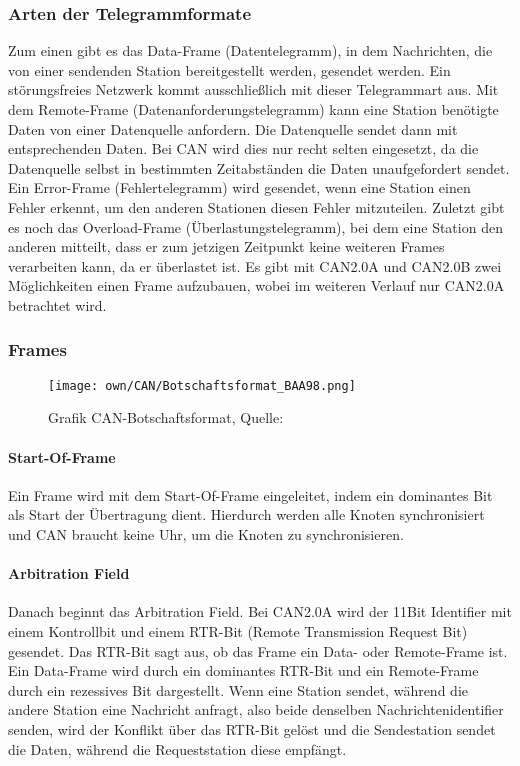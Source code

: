         \subsubsection{Arten der Telegrammformate}
        Zum einen gibt es das Data-Frame (Datentelegramm), in dem Nachrichten, die von einer sendenden Station bereitgestellt werden, gesendet werden.
        Ein störungsfreies Netzwerk kommt ausschließlich mit dieser Telegrammart aus.
        Mit dem Remote-Frame (Datenanforderungstelegramm) kann eine Station benötigte Daten von einer Datenquelle anfordern.
        Die Datenquelle sendet dann mit entsprechenden Daten.
        Bei CAN wird dies nur recht selten eingesetzt, da die Datenquelle selbst in bestimmten Zeitabständen die Daten unaufgefordert sendet.
        Ein Error-Frame (Fehlertelegramm) wird gesendet, wenn eine Station einen Fehler erkennt, um den anderen Stationen diesen Fehler mitzuteilen.
        Zuletzt gibt es noch das Overload-Frame (Überlastungstelegramm), bei dem eine Station den anderen mitteilt, dass er zum jetzigen Zeitpunkt keine weiteren Frames verarbeiten kann, da er überlastet ist.
        Es gibt mit CAN2.0A und CAN2.0B zwei Möglichkeiten einen Frame aufzubauen, wobei im weiteren Verlauf nur CAN2.0A betrachtet wird. 

        \subsubsection{Frames}
        \begin{figure}[!htbp]
            \centering
            \texttt{[image: own/CAN/Botschaftsformat\_BAA98.png]}
            \caption{Grafik CAN-Botschaftsformat, Quelle: \cite{BAA2011, S.98}}
            \label{fig:Botschaftsformat}
        \end{figure}

            \paragraph{Start-Of-Frame}
            Ein Frame wird mit dem Start-Of-Frame eingeleitet, indem ein dominantes Bit als Start der Übertragung dient.
            Hierdurch werden alle Knoten synchronisiert und CAN braucht keine Uhr, um die Knoten zu synchronisieren. 

            \paragraph{Arbitration Field}
            Danach beginnt das Arbitration Field.
            Bei CAN2.0A wird der 11Bit Identifier mit einem Kontrollbit und einem RTR-Bit (Remote Transmission Request Bit) gesendet.
            Das RTR-Bit sagt aus, ob das Frame ein Data- oder Remote-Frame ist.
            Ein Data-Frame wird durch ein dominantes RTR-Bit und ein Remote-Frame durch ein rezessives Bit dargestellt.
            Wenn eine Station sendet, während die andere Station eine Nachricht anfragt, also beide denselben Nachrichtenidentifier senden, wird der Konflikt über das RTR-Bit gelöst und die Sendestation sendet die Daten, während die Requeststation diese empfängt. 


